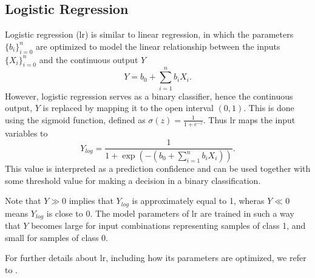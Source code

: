 \subsection{Logistic Regression}
Logistic regression (\gls{lr}) is similar to linear regression, in which the parameters $\{b_i\}_{i=0}^n$ are optimized to model the linear relationship between the inputs $\{X_i\}_{i=0}^n$ and the continuous output $Y$
\begin{equation}
	Y= b_0+\sum_{i=1}^n b_iX_i.
\end{equation}
However, logistic regression serves as a binary classifier, hence the continuous output, $Y$ is replaced by mapping it to the open interval $(0,1)$. This is done using the sigmoid function, defined as $\sigma(z)=\frac{1}{1+e^{-z}}$. Thus \gls{lr} maps the input variables to
\begin{equation}
\label{eq:log_eq}
	Y_{log}= \frac{1}{1+\exp(-(b_0 + \sum_{i=1}^n b_iX_i))}.
\end{equation}
This value is interpreted as a prediction confidence and can be used together with some threshold value for making a decision in a binary classification.

Note that $Y\gg 0$ implies that $Y_{log}$ is approximately equal to 1, wheras $Y\ll 0$ means $Y_{log}$ is close to 0. The model parameters of \gls{lr} are trained in such a way that $Y$ becomes large for input combinations representing samples of class 1, and small for samples of class 0.

For further details about \gls{lr}, including how its parameters are optimized, we refer to \citep{shalev-shwartz_ben-david_2016}.





